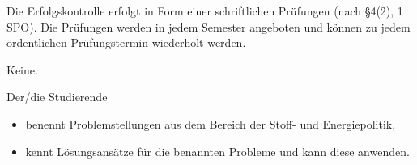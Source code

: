 \begin{course}

\setdoclanguagegerman
{}



\coursehead


\label{cour_4565.dp_997}


\begin{styleenv}
\begin{assessment}
Die Erfolgskontrolle erfolgt in Form einer schriftlichen Prüfungen (nach §4(2), 1 SPO). Die Prüfungen werden in jedem Semester angeboten und können zu jedem ordentlichen Prüfungstermin wiederholt werden.


\end{assessment}

\begin{conditions}Keine.\end{conditions}


\end{styleenv}

\begin{learningoutcomes}
Der/die Studierende

 \begin{itemize}\item benennt Problemstellungen aus dem Bereich der Stoff- und Energiepolitik,  \item kennt Lösungsansätze für die benannten Probleme und kann diese anwenden.  \end{itemize}
\end{learningoutcomes}


\end{course}
